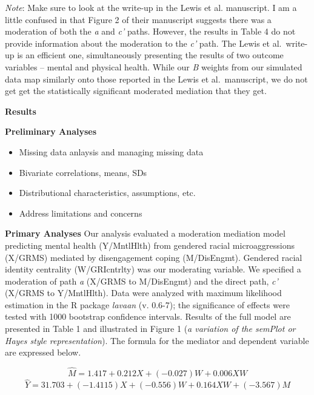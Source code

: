 \documentclass[
  english,
]{book}
\providecommand{\tightlist}{%
  \setlength{\itemsep}{0pt}\setlength{\parskip}{0pt}}
\begin{document}
\emph{Note}: Make sure to look at the write-up in the Lewis et al. \citep{lewis_applying_2017} manuscript. I am a little confused in that Figure 2 of their manuscript suggests there was a moderation of both the \emph{a} and \emph{c'} paths. However, the results in Table 4 do not provide information about the moderation to the \emph{c'} path. The Lewis et al.~write-up is an efficient one, simultaneously presenting the results of two outcome variables -- mental and physical health. While our \emph{B} weights from our simulated data map similarly onto those reported in the Lewis et al.~manuscript, we do not get get the statistically significant moderated mediation that they get.

\textbf{Results}

\textbf{Preliminary Analyses}

\begin{itemize}
\tightlist
\item
  Missing data anlaysis and managing missing data
\item
  Bivariate correlations, means, SDs
\item
  Distributional characteristics, assumptions, etc.
\item
  Address limitations and concerns
\end{itemize}

\textbf{Primary Analyses}
Our analysis evaluated a moderation mediation model predicting mental health (Y/MntlHlth) from gendered racial microaggressions (X/GRMS) mediated by disengagement coping (M/DisEngmt). Gendered racial identity centrality (W/GRIcntrlty) was our moderating variable. We specified a moderation of path \emph{a} (X/GRMS to M/DisEngmt) and the direct path, \emph{c'} (X/GRMS to Y/MntlHlth). Data were analyzed with maximum likelihood estimation in the R package \emph{lavaan} (v. 0.6-7); the significance of effects were tested with 1000 bootstrap confidence intervals. Results of the full model are presented in Table 1 and illustrated in Figure 1 (\emph{a variation of the semPlot or Hayes style representation}). The formula for the mediator and dependent variable are expressed below.

\[\hat{M} = 1.417 + 0.212X + (-0.027) W + 0.006XW\]
\[\hat{Y} = 31.703 + (-1.4115)X + (-0.556)W + 0.164XW + (-3.567)M\]
\end{document}
